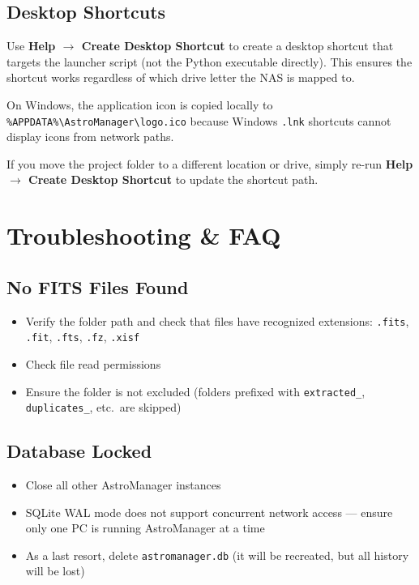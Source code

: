 \documentclass[11pt,a4paper]{article}
\begin{document}
\subsection{Desktop Shortcuts}

Use \textbf{Help $\rightarrow$ Create Desktop Shortcut} to create a desktop shortcut that targets the launcher script (not the Python executable directly). This ensures the shortcut works regardless of which drive letter the NAS is mapped to.

On Windows, the application icon is copied locally to \texttt{\%APPDATA\%\textbackslash AstroManager\textbackslash logo.ico} because Windows \texttt{.lnk} shortcuts cannot display icons from network paths.

\begin{tipbox}
If you move the project folder to a different location or drive, simply re-run \textbf{Help $\rightarrow$ Create Desktop Shortcut} to update the shortcut path.
\end{tipbox}


\section{Troubleshooting \& FAQ}
\label{sec:faq}

\subsection{No FITS Files Found}

\begin{itemize}
    \item Verify the folder path and check that files have recognized extensions: \texttt{.fits}, \texttt{.fit}, \texttt{.fts}, \texttt{.fz}, \texttt{.xisf}
    \item Check file read permissions
    \item Ensure the folder is not excluded (folders prefixed with \texttt{extracted\_}, \texttt{duplicates\_}, etc.\ are skipped)
\end{itemize}

\subsection{Database Locked}

\begin{itemize}
    \item Close all other AstroManager instances
    \item SQLite WAL mode does not support concurrent network access --- ensure only one PC is running AstroManager at a time
    \item As a last resort, delete \texttt{astromanager.db} (it will be recreated, but all history will be lost)
\end{itemize}
\end{document}
